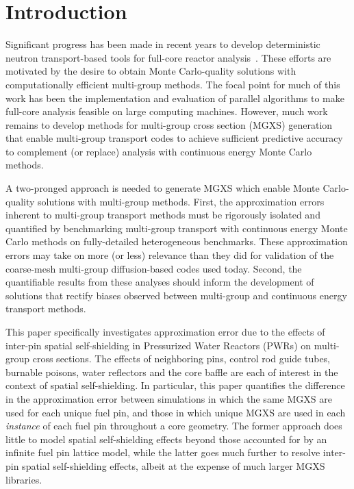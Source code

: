 \section{Introduction}
\label{sec:intro}

Significant progress has been made in recent years to develop deterministic neutron transport-based tools for full-core reactor analysis~\citep{gunow20173dmoc, ryu2015solution, kochunas2013overview, evans2010denovo, palmiotti2007unic}. These efforts are motivated by the desire to obtain Monte Carlo-quality solutions with computationally efficient multi-group methods. The focal point for much of this work has been the implementation and evaluation of parallel algorithms to make full-core analysis feasible on large computing machines. However, much work remains to develop methods for multi-group cross section (MGXS) generation that enable multi-group transport codes to achieve sufficient predictive accuracy to complement (or replace) analysis with continuous energy Monte Carlo methods.

A two-pronged approach is needed to generate MGXS which enable Monte Carlo-quality solutions with multi-group methods. First, the approximation errors inherent to multi-group transport methods must be rigorously isolated and quantified by benchmarking multi-group transport with continuous energy Monte Carlo methods on fully-detailed heterogeneous benchmarks. These approximation errors may take on more (or less) relevance than they did for validation of the coarse-mesh multi-group diffusion-based codes used today. Second, the quantifiable results from these analyses should inform the development of solutions that rectify biases observed between multi-group and continuous energy transport methods.

This paper specifically investigates approximation error due to the effects of inter-pin spatial self-shielding in Pressurized Water Reactors (PWRs) on multi-group cross sections. The effects of neighboring pins, control rod guide tubes, burnable poisons, water reflectors and the core baffle are each of interest in the context of spatial self-shielding. In particular, this paper quantifies the difference in the approximation error between simulations in which the same MGXS are used for each unique fuel pin, and those in which unique MGXS are used in each \textit{instance} of each fuel pin throughout a core geometry. The former approach does little to model spatial self-shielding effects beyond those accounted for by an infinite fuel pin lattice model, while the latter goes much further to resolve inter-pin spatial self-shielding effects, albeit at the expense of much larger MGXS libraries.

